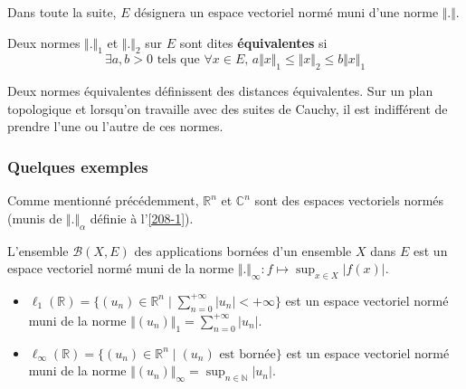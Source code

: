 	Dans toute la suite, $E$ désignera un espace vectoriel normé muni d'une norme $\Vert . \Vert$.

	\begin{definition}
		Deux normes $\Vert . \Vert_1$ et $\Vert . \Vert_2$ sur $E$ sont dites \textbf{équivalentes} si
		\[ \exists a, b > 0 \text{ tels que } \forall x \in E, \, a \Vert x \Vert_1 \leq \Vert x \Vert_2 \leq b \Vert x \Vert_1 \]
	\end{definition}

	\begin{remark}
		Deux normes équivalentes définissent des distances équivalentes. Sur un plan topologique et lorsqu'on travaille avec des suites de Cauchy, il est indifférent de prendre l'une ou l'autre de ces normes.
	\end{remark}

	\subsubsection{Quelques exemples}

	\begin{example}
		Comme mentionné précédemment, $\mathbb{R}^n$ et $\mathbb{C}^n$ sont des espaces vectoriels normés (munis de $\Vert . \Vert_\alpha$ définie à l'\cref{208-1}).
	\end{example}


	\begin{example}
		L'ensemble $\mathcal{B}(X,E)$ des applications bornées d'un ensemble $X$ dans $E$ est un espace vectoriel normé muni de la norme $\Vert . \Vert_\infty : f \mapsto \sup_{x \in X} \vert f(x) \vert$.
	\end{example}


	\begin{example}
		\begin{itemize}
			\item $\ell_1(\mathbb{R}) = \{ (u_n) \in \mathbb{R}^n \mid \sum_{n=0}^{+\infty} \vert u_n \vert < +\infty \}$ est un espace vectoriel normé muni de la norme $\Vert (u_n) \Vert_1 = \sum_{n=0}^{+\infty} \vert u_n \vert$.
			\item $\ell_\infty(\mathbb{R}) = \{ (u_n) \in \mathbb{R}^n \mid (u_n) \text{ est bornée} \}$ est un espace vectoriel normé muni de la norme $\Vert (u_n) \Vert_\infty = \sup_{n \in \mathbb{N}} \vert u_n \vert$.
		\end{itemize}
	\end{example}

